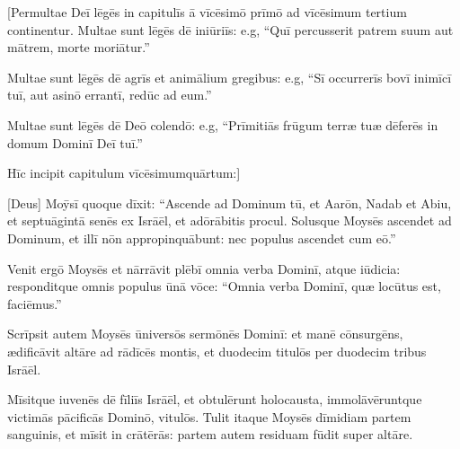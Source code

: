 

\vspace*{-1.4cm}
\thispagestyle{empty}

[Permultae Deī lēgēs in capitulīs ā vīcēsimō prīmō ad vīcēsimum tertium
continentur. Multae sunt lēgēs dē iniūriīs: e.g, ``Quī percusserit patrem
suum aut mātrem, morte moriātur.''

Multae sunt lēgēs dē agrīs et animālium
gregibus: e.g, ``Sī occurrerīs bovī inimīcī tuī, aut asinō errantī, redūc
ad eum.''

Multae sunt lēgēs dē Deō colendō: e.g, ``Prīmitiās frūgum terræ
tuæ dēferēs in domum Dominī Deī tuī.''

Hīc incipit
capitulum vīcēsimum\linebreak quārtum:]

[Deus] Moȳsī quoque dīxit: ``Ascende ad Dominum
tū, et Aarōn, Nadab et Abiu, et septuāgintā senēs ex
Isrāēl, et adōrābitis procul.
Solusque
Moysēs ascendet ad Dominum, et illī nōn appropinquābunt:
nec populus ascendet cum eō.''

Venit ergō Moysēs et nārrāvit
plēbī omnia verba Dominī, atque
iūdicia:
responditque omnis populus ūnā vōce: ``Omnia verba Dominī, quæ locūtus est,
faciēmus.''

Scrīpsit autem Moysēs ūniversōs sermōnēs Dominī: et manē
cōnsurgēns, ædificāvit altāre ad
rādīcēs montis,
et duodecim titulōs per duodecim tribus
Isrāēl. 

Mīsitque iuvenēs dē fīliīs Isrāēl, et obtulērunt
holocausta,
immolāvēruntque victimās pācificās Dominō, vitulōs.  
Tulit itaque Moysēs
dīmidiam partem sanguinis, et mīsit in crātērās: partem
autem residuam fūdit super altāre. 

